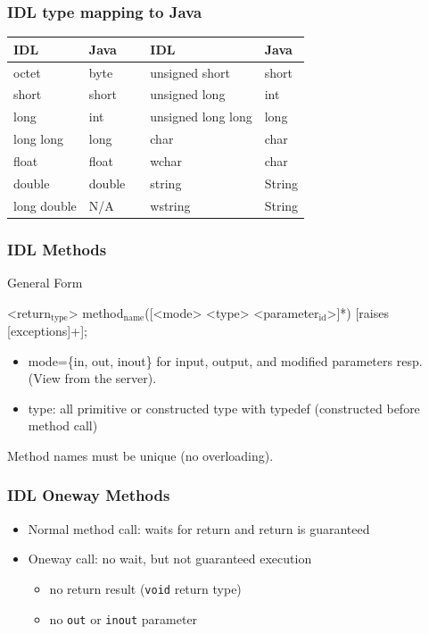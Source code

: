 \documentclass[bigger,hyperref={colorlinks=true, urlcolor=red, plainpages=false, pdfpagelabels, bookmarksnumbered}]{beamer}
\begin{document}
\begin{frame}
\frametitle{IDL type mapping to Java}
\label{sec-4-6}



\begin{center}
\begin{tabular}{lllll}
 IDL          &  Java    &     &  IDL                 &  Java    \\
\hline
 octet        &  byte    &     &  unsigned short      &  short   \\
 short        &  short   &     &  unsigned long       &  int     \\
 long         &  int     &     &  unsigned long long  &  long    \\
 long long    &  long    &     &  char                &  char    \\
 float        &  float   &     &  wchar               &  char    \\
 double       &  double  &     &  string              &  String  \\
 long double  &  N/A     &     &  wstring             &  String  \\
\end{tabular}
\end{center}
\end{frame}
\begin{frame}
\frametitle{IDL Methods}
\label{sec-4-7}
\begin{block}{General Form}
\label{sec-4-7-1}

<return$_{\mathrm{type}}$> method$_{\mathrm{name}}$([<mode> <type> <parameter$_{\mathrm{id}}$>]*) [raises [exceptions]+]; 


\begin{itemize}
\item mode=\{in, out, inout\} for input, output, and modified parameters resp. (View from the server).
\item type: all primitive or constructed type with typedef (constructed before method call)
\end{itemize}

Method names must be unique (no overloading).
\end{block}
\end{frame}
\begin{frame}
\frametitle{IDL Oneway Methods}
\label{sec-4-8}
\begin{itemize}

\item Normal method call: waits for return and return is guaranteed
\label{sec-4-8-1}%


\item Oneway call: no wait, but not guaranteed execution
\label{sec-4-8-2}%
\begin{itemize}
\item no return result (\texttt{void} return type)
\item no \texttt{out} or \texttt{inout} parameter
\end{itemize}

\end{itemize} %
\end{frame}
\end{document}
